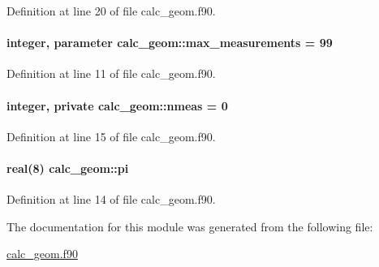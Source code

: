 Definition at line 20 of file calc\-\_\-geom.\-f90.

\hypertarget{classcalc__geom_a9792dfc7813bbf3d193a21e946a4460f}{
\paragraph[{max\-\_\-measurements}]{\setlength{\rightskip}{0pt plus 5cm}integer, parameter calc\-\_\-geom\-::max\-\_\-measurements = 99}}\label{classcalc__geom_a9792dfc7813bbf3d193a21e946a4460f}


Definition at line 11 of file calc\-\_\-geom.\-f90.

\hypertarget{classcalc__geom_a120f001322619233d25372313bf9b62b}{
\paragraph[{nmeas}]{\setlength{\rightskip}{0pt plus 5cm}integer, private calc\-\_\-geom\-::nmeas = 0\hspace{0.3cm}{\ttfamily [private]}}}\label{classcalc__geom_a120f001322619233d25372313bf9b62b}


Definition at line 15 of file calc\-\_\-geom.\-f90.

\hypertarget{classcalc__geom_a80764b759226af675fbef8f07e4f8432}{
\paragraph[{pi}]{\setlength{\rightskip}{0pt plus 5cm}real(8) calc\-\_\-geom\-::pi}}\label{classcalc__geom_a80764b759226af675fbef8f07e4f8432}


Definition at line 14 of file calc\-\_\-geom.\-f90.



The documentation for this module was generated from the following file\-:\begin{DoxyCompactItemize}
\item 
\hyperlink{calc__geom_8f90}{calc\-\_\-geom.\-f90}\end{DoxyCompactItemize}
